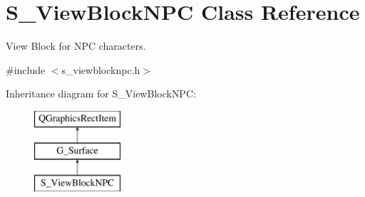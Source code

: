 \hypertarget{class_s___view_block_n_p_c}{}\section{S\+\_\+\+View\+Block\+N\+P\+C Class Reference}
\label{class_s___view_block_n_p_c}


View Block for N\+P\+C characters.  




{\ttfamily \#include $<$s\+\_\+viewblocknpc.\+h$>$}

Inheritance diagram for S\+\_\+\+View\+Block\+N\+P\+C\+:\begin{figure}[H]
\begin{center}
\leavevmode
\includegraphics[height=3.000000cm]{class_s___view_block_n_p_c}
\end{center}
\end{figure}
